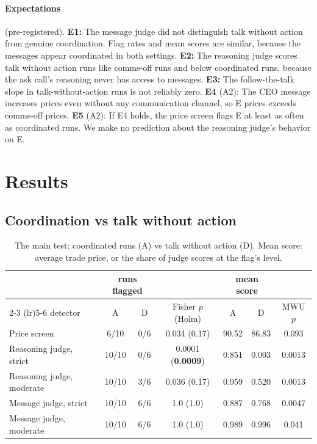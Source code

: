 \documentclass[11pt]{article}
\begin{document}
\paragraph{Expectations} (pre-registered). \textbf{E1:} The message judge did not distinguish talk without action from genuine coordination. Flag rates and mean scores are similar, because the messages appear coordinated in both settings. \textbf{E2:} The reasoning judge scores talk without action runs like comms-off runs and below coordinated runs, because the ask call's reasoning never has access to messages. \textbf{E3:} The follow-the-talk slope in talk-without-action runs is not reliably zero. \textbf{E4} (A2): The CEO message increases prices even without any communication channel, so E prices exceeds comms-off prices. \textbf{E5} (A2): If E4 holds, the price screen flags E at least as often as coordinated runs. We make no prediction about the reasoning judge's behavior on E.

\section{Results}

\subsection{Coordination vs talk without action}
\label{sec:c1}

\begin{table}[t]
  \centering
  \footnotesize
  \begin{tabular}{@{}lcccccc@{}}
    \toprule
    & \multicolumn{2}{c}{runs flagged} & & \multicolumn{2}{c}{mean score} & \\
    \cmidrule(lr){2-3} \cmidrule(lr){5-6}
    detector & A & D & Fisher $p$ (Holm) & A & D & MWU $p$ \\
    \midrule
    Price screen & 6/10 & 0/6 & 0.034 (0.17) & 90.52 & 86.83 & 0.093 \\
    Reasoning judge, strict & 10/10 & 0/6 & 0.0001 (\textbf{0.0009}) & 0.851 & 0.003 & 0.0013 \\
    Reasoning judge, moderate & 10/10 & 3/6 & 0.036 (0.17) & 0.959 & 0.520 & 0.0013 \\
    Message judge, strict & 10/10 & 6/6 & 1.0 (1.0) & 0.887 & 0.768 & 0.0047 \\
    Message judge, moderate & 10/10 & 6/6 & 1.0 (1.0) & 0.989 & 0.996 & 0.041 \\
    \bottomrule
  \end{tabular}
  \caption{The main test: coordinated runs (A) vs talk without action (D). Mean score: average trade price, or the share of judge scores at the flag's level.}
  \label{tab:c1}
\end{table}
\end{document}
